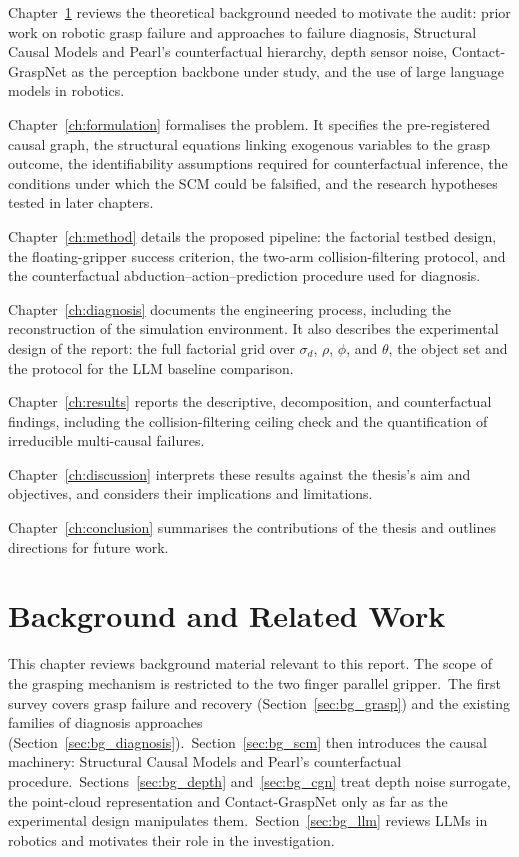 \documentclass[11pt,a4paper]{report}
\begin{document}
Chapter~\ref{ch:background} reviews the theoretical background needed to motivate the audit: prior work on robotic grasp failure and approaches to failure diagnosis, Structural Causal Models and Pearl's counterfactual hierarchy, depth sensor noise, Contact-GraspNet as the perception backbone under study, and the use of large language models in robotics.

Chapter~\ref{ch:formulation} formalises the problem. It specifies the pre-registered causal graph, the structural equations linking exogenous variables to the grasp outcome, the identifiability assumptions required for counterfactual inference, the conditions under which the SCM could be falsified, and the research hypotheses tested in later chapters.

Chapter~\ref{ch:method} details the proposed pipeline: the factorial testbed design, the floating-gripper success criterion, the two-arm collision-filtering protocol, and the counterfactual abduction--action--prediction procedure used for diagnosis.

Chapter~\ref{ch:diagnosis} documents the engineering process, including the reconstruction of the simulation environment. It also describes the experimental design of the report: the full factorial grid over $\sigma_d$, $\rho$, $\phi$, and $\theta$, the object set and the protocol for the LLM baseline comparison.

Chapter~\ref{ch:results} reports the descriptive, decomposition, and counterfactual findings, including the collision-filtering ceiling check and the quantification of irreducible multi-causal failures.

Chapter~\ref{ch:discussion} interprets these results against the thesis's aim and objectives, and considers their implications and limitations.

Chapter~\ref{ch:conclusion} summarises the contributions of the thesis and outlines directions for future work.


\chapter{Background and Related Work}
\label{ch:background}

This chapter reviews background material relevant to this report. The scope of the grasping mechanism is restricted to the two finger parallel gripper.~The first survey covers grasp failure and recovery (Section~\ref{sec:bg_grasp}) and the existing families of diagnosis approaches (Section~\ref{sec:bg_diagnosis}).~Section~\ref{sec:bg_scm} then introduces the causal machinery: Structural Causal Models and Pearl's counterfactual procedure.~Sections~\ref{sec:bg_depth} and~\ref{sec:bg_cgn} treat depth noise surrogate, the point-cloud representation and Contact-GraspNet only as far as the experimental design manipulates them.~Section~\ref{sec:bg_llm} reviews LLMs in robotics and motivates their role in the investigation.
\end{document}
